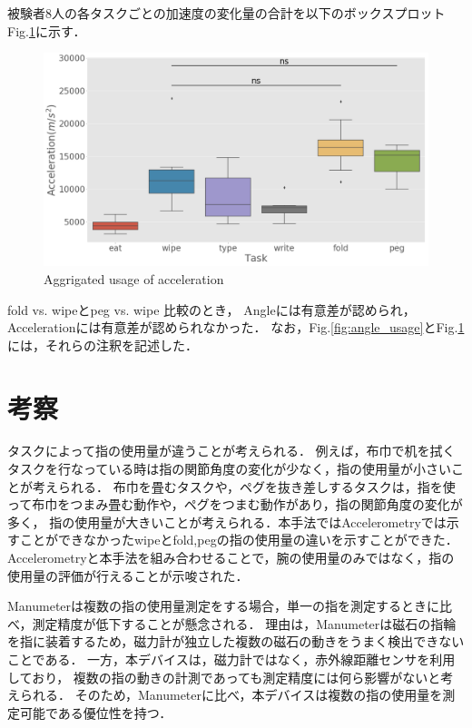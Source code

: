 被験者8人の各タスクごとの加速度の変化量の合計を以下のボックスプロットFig.\ref{fig:accel_usage}に示す．

\begin{figure}[H]
  \centering
  \includegraphics[width=0.8\linewidth]{fig/boxplot_accel}
  \caption{Aggrigated usage of acceleration}
  \label{fig:accel_usage}
\end{figure}

fold vs. wipeとpeg vs. wipe 比較のとき，
Angleには有意差が認められ，Accelerationには有意差が認められなかった．
なお，Fig.\ref{fig:angle_usage}とFig.\ref{fig:accel_usage}には，それらの注釈を記述した．



\section{考察}
タスクによって指の使用量が違うことが考えられる．
例えば，布巾で机を拭くタスクを行なっている時は指の関節角度の変化が少なく，指の使用量が小さいことが考えられる．
布巾を畳むタスクや，ペグを抜き差しするタスクは，指を使って布巾をつまみ畳む動作や，ペグをつまむ動作があり，指の関節角度の変化が多く，
指の使用量が大きいことが考えられる．本手法ではAccelerometryでは示すことができなかったwipeとfold,pegの指の使用量の違いを示すことができた．
Accelerometryと本手法を組み合わせることで，腕の使用量のみではなく，指の使用量の評価が行えることが示唆された．

Manumeterは複数の指の使用量測定をする場合，単一の指を測定するときに比べ，測定精度が低下することが懸念される．
理由は，Manumeterは磁石の指輪を指に装着するため，磁力計が独立した複数の磁石の動きをうまく検出できないことである．
一方，本デバイスは，磁力計ではなく，赤外線距離センサを利用しており，
複数の指の動きの計測であっても測定精度には何ら影響がないと考えられる．
そのため，Manumeterに比べ，本デバイスは複数の指の使用量を測定可能である優位性を持つ．

